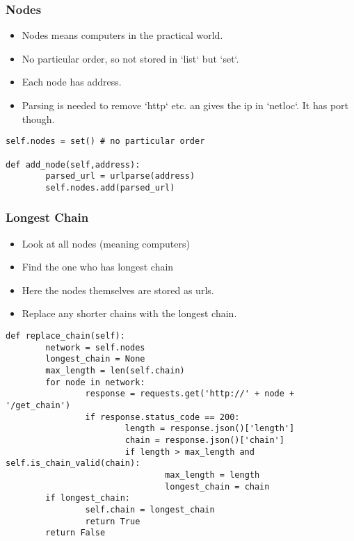 \begin{frame}[fragile]\frametitle{Nodes}
\begin{itemize}
\item Nodes means computers in  the practical world.
\item No particular order, so not stored in `list` but `set`.
\item Each node has address.
\item Parsing is needed to remove `http` etc. an gives the ip in `netloc`. It has port though.
\end{itemize}

\begin{lstlisting}
self.nodes = set() # no particular order

def add_node(self,address):
		parsed_url = urlparse(address)
		self.nodes.add(parsed_url)
\end{lstlisting}
\end{frame}

\begin{frame}[fragile]\frametitle{Longest Chain}
\begin{itemize}
\item Look at all nodes (meaning computers)
\item Find the one who has longest chain
\item Here the nodes themselves are stored as urls.
\item Replace any shorter chains with the longest chain.
\end{itemize}

\begin{lstlisting}
def replace_chain(self):
		network = self.nodes
		longest_chain = None
		max_length = len(self.chain)
		for node in network:
				response = requests.get('http://' + node + '/get_chain')
				if response.status_code == 200:
						length = response.json()['length']
						chain = response.json()['chain']
						if length > max_length and self.is_chain_valid(chain):
								max_length = length
								longest_chain = chain
		if longest_chain:
				self.chain = longest_chain
				return True
		return False
\end{lstlisting}
\end{frame}


